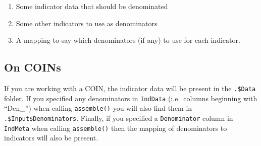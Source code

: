 \documentclass[
]{book}
\providecommand{\tightlist}{%
  \setlength{\itemsep}{0pt}\setlength{\parskip}{0pt}}
\begin{document}
\begin{enumerate}
\def\labelenumi{\arabic{enumi}.}
\tightlist
\item
  Some indicator data that should be denominated
\item
  Some other indicators to use as denominators
\item
  A mapping to say which denominators (if any) to use for each indicator.
\end{enumerate}

\hypertarget{on-coins}{%
\subsection{On COINs}\label{on-coins}}

If you are working with a COIN, the indicator data will be present in the \texttt{.\$Data} folder. If you specified any denominators in \texttt{IndData} (i.e.~columns beginning with ``Den\_'') when calling \texttt{assemble()} you will also find them in \texttt{.\$Input\$Denominators}. Finally, if you specified a \texttt{Denominator} column in \texttt{IndMeta} when calling \texttt{assemble()} then the mapping of denominators to indicators will also be present.
\end{document}
